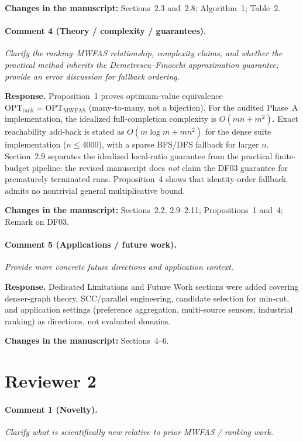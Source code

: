 \documentclass[11pt]{article}
\newcommand{\commentbox}[1]{\par\textit{#1}\par\medskip}
\newcommand{\changes}[1]{\textbf{Changes in the manuscript:} #1\par\medskip}
\begin{document}
\changes{Sections~2.3 and~2.8; Algorithm~1; Table~2.}

\paragraph{Comment 4 (Theory / complexity / guarantees).}
\commentbox{Clarify the ranking--MWFAS relationship, complexity claims, and whether the practical method inherits the Demetrescu--Finocchi approximation guarantee; provide an error discussion for fallback ordering.}

\noindent\textbf{Response.}
Proposition~1 proves optimum-value equivalence $\mathrm{OPT}_{\mathrm{rank}}=\mathrm{OPT}_{\mathrm{MWFAS}}$ (many-to-many, not a bijection). For the audited Phase~A implementation, the idealized full-completion complexity is $O(mn+m^{2})$. Exact reachability add-back is stated as $O(m\log m+mn^{2})$ for the dense suite implementation ($n\le 4000$), with a sparse BFS/DFS fallback for larger $n$. Section~2.9 separates the idealized local-ratio guarantee from the practical finite-budget pipeline: the revised manuscript does \emph{not} claim the DF03 guarantee for prematurely terminated runs. Proposition~4 shows that identity-order fallback admits no nontrivial general multiplicative bound.

\changes{Sections~2.2, 2.9--2.11; Propositions~1 and~4; Remark on DF03.}

\paragraph{Comment 5 (Applications / future work).}
\commentbox{Provide more concrete future directions and application context.}

\noindent\textbf{Response.}
Dedicated Limitations and Future Work sections were added covering denser-graph theory, SCC/parallel engineering, candidate selection for min-cut, and application settings (preference aggregation, multi-source sensors, industrial ranking) as directions, not evaluated domains.

\changes{Sections~4--6.}

\section*{Reviewer 2}

\paragraph{Comment 1 (Novelty).}
\commentbox{Clarify what is scientifically new relative to prior MWFAS / ranking work.}
\end{document}
